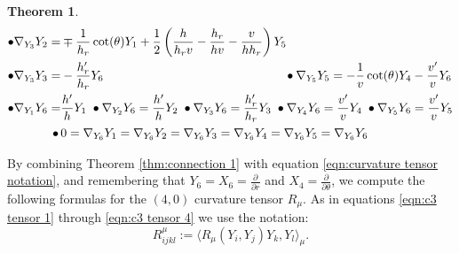 \documentclass[10pt]{amsart}
\def\la{\langle}
\def\ra{\rangle}
\def\ddt{\frac{\partial}{\partial \theta}}
\def\ddr{\frac{\partial}{\partial r}}
\def\th{\theta}
\newtheorem{theorem}{Theorem}[section]
\theoremstyle{definition}
\theoremstyle{remark}
\numberwithin{equation}{section}
\begin{document}
\begin{theorem}
\begin{align*}
	\bullet \nabla_{Y_3}Y_2 = & \mp \frac{1}{h_r} \cot(\th) Y_1 + \frac{1}{2} \left( \frac{h}{h_r v} - \frac{h_r}{hv} - \frac{v}{hh_r} \right) Y_5    \\
	\bullet \nabla_{Y_3}Y_3 = & - \frac{h_r'}{h_r} Y_6	\hskip 148pt  \bullet \nabla_{Y_5}Y_5 = - \frac{1}{v} \cot(\th) Y_4 - \frac{v'}{v} Y_6	  \\ %
	\bullet \nabla_{Y_1}Y_6 = &\frac{h'}{h} Y_1	\hskip 3pt	\bullet \nabla_{Y_2}Y_6 = \frac{h'}{h} Y_2	\hskip 3pt	\bullet \nabla_{Y_3}Y_6 = \frac{h_r'}{h_r}Y_3	\hskip 3pt	\bullet \nabla_{Y_4}Y_6 = \frac{v'}{v} Y_4	\hskip 3pt	\bullet \nabla_{Y_5}Y_6 = \frac{v'}{v} Y_5  \\
	\bullet \, &0 = \nabla_{Y_6}Y_1 = \nabla_{Y_6}Y_2 = \nabla_{Y_6}Y_3 = \nabla_{Y_6}Y_4 = \nabla_{Y_6}Y_5 = \nabla_{Y_6}Y_6 %
	\end{align*}
\end{theorem}

\vskip 10pt

By combining Theorem \ref{thm:connection 1} with equation \eqref{eqn:curvature tensor notation}, and remembering that $Y_6 = X_6 = \ddr$ and $X_4 = \ddt$, we compute the following formulas for the $(4,0)$ curvature tensor $R_\mu$.  
As in equations \eqref{eqn:c3 tensor 1} through \eqref{eqn:c3 tensor 4} we use the notation:
	\begin{equation*}
	R^{\mu}_{ijkl} := \la R_{\mu}(Y_i,Y_j)Y_k, Y_l \ra_\mu.
	\end{equation*}

\vskip 20pt
\end{document}
